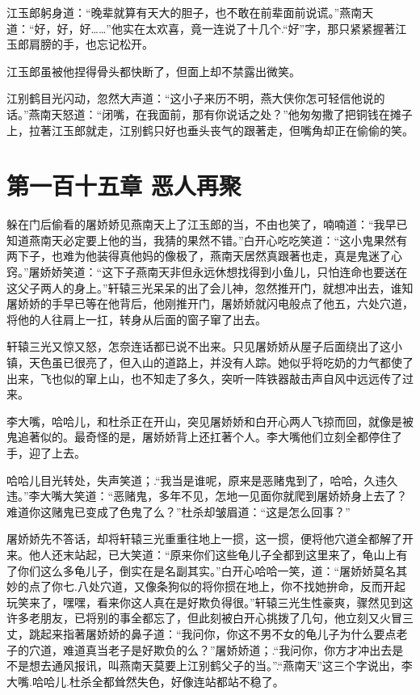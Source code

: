 \documentclass[12pt,oneside]{book}
\begin{document}
江玉郎躬身道：``晚辈就算有天大的胆子，也不敢在前辈面前说谎。''燕南天道：``好，好，好\ldots\ldots{}''他实在太欢喜，竟一连说了十几个.``好''字，那只紧紧握著江玉郎肩膀的手，也忘记松开。

江玉郎虽被他捏得骨头都快断了，但面上却不禁露出微笑。

江别鹤目光闪动，忽然大声道：``这小子来历不明，燕大侠你怎可轻信他说的话。''燕南天怒道：``闭嘴，在我面前，那有你说话之处？''他匆匆撒了把铜钱在摊子上，拉著江玉郎就走，江别鹤只好也垂头丧气的跟著走，但嘴角却正在偷偷的笑。

\hypertarget{ux7b2cux4e00ux767eux5341ux4e94ux7ae0-ux6076ux4ebaux518dux805a}{%
\chapter{第一百十五章
恶人再聚}\label{ux7b2cux4e00ux767eux5341ux4e94ux7ae0-ux6076ux4ebaux518dux805a}}

躲在门后偷看的屠娇娇见燕南天上了江玉郎的当，不由也笑了，喃喃道：``我早已知道燕南天必定要上他的当，我猜的果然不错。''白开心吃吃笑道：``这小鬼果然有两下子，也难为他装得真他妈的像极了，燕南天居然真跟著也走，真是鬼迷了心窍。''屠娇娇笑道：``这下子燕南天非但永远休想找得到小鱼儿，只怕连命也要送在这父子两人的身上。''轩辕三光呆呆的出了会儿神，忽然推开门，就想冲出去，谁知屠娇娇的手早已等在他背后，他刚推开门，屠娇娇就闪电般点了他五，六处穴道，将他的人往肩上一扛，转身从后面的窗子窜了出去。

轩辕三光又惊又怒，怎奈连话都已说不出来。只见屠娇娇从屋子后面绕出了这小镇，天色虽已很亮了，但入山的道路上，并没有人踪。她似乎将吃奶的力气都使了出来，飞也似的窜上山，也不知走了多久，突听一阵铁器敲击声自风中远远传了过来。

李大嘴，哈哈儿，和杜杀正在开山，突见屠娇娇和白开心两人飞掠而回，就像是被鬼追著似的。最奇怪的是，屠娇娇背上还扛著个人。李大嘴他们立刻全都停住了手，迎了上去。

哈哈儿目光转处，失声笑道；.``我当是谁呢，原来是恶赌鬼到了，哈哈，久违久违。''李大嘴大笑道：``恶赌鬼，多年不见，怎地一见面你就爬到屠娇娇身上去了？难道你这赌鬼已变成了色鬼了么？''杜杀却皱眉道：``这是怎么回事？''

屠娇娇先不答话，却将轩辕三光重重往地上一掼，这一掼，便将他穴道全都解了开来。他人还末站起，已大笑道：``原来你们这些龟儿子全都到这里来了，龟山上有了你们这么多龟儿子，倒实在是名副其实。''白开心哈哈一笑，道：``屠娇娇莫名其妙的点了你七.八处穴道，又像条狗似的将你掼在地上，你不找她拚命，反而开起玩笑来了，嘿嘿，看来你这人真在是好欺负得很。''轩辕三光生性豪爽，骤然见到这许多老朋友，已将别的事全都忘了，但此刻被白开心挑拨了几句，他立刻又火冒三丈，跳起来指著屠娇娇的鼻子道：``我问你，你这不男不女的龟儿子为什么要点老子的穴道，难道真当老子是好欺负的么？''屠娇娇道；.``我问你，你方才冲出去是不是想去通风报讯，叫燕南天莫要上江别鹤父子的当。''.``燕南天''这三个字说出，李大嘴.哈哈儿.杜杀全都耸然失色，好像连站都站不稳了。
\end{document}
